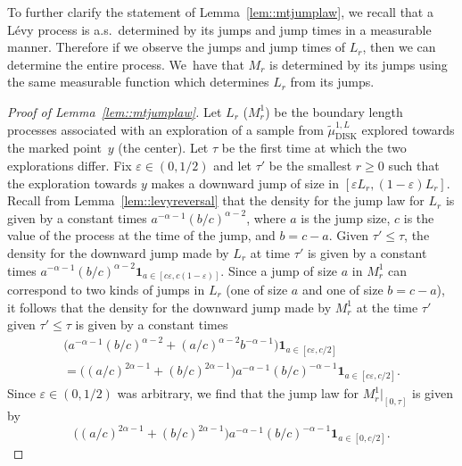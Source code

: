 \documentclass[JEP,XML,SOM,Unicode]{cedram}
\let\epsilon\varepsilon
\theoremstyle{plain}
\numberwithin{theorem}{section}
\theoremstyle{definition}
\newcommand{\one}{{\mathbf 1}}
\newcommand{\tmudonel}{\wt{\mu}_{ \mathrm{DISK}}^{1, L}}
\let\wt\widetilde
\begin{document}
To further clarify the statement of Lemma~\ref{lem::mtjumplaw}, we recall that a Lévy process is a.s.\ determined by its jumps and jump times in a measurable manner. Therefore if we observe the jumps and jump times of $L_r$, then we can determine the entire process. We~have that $M_r$ is determined by its jumps using the same measurable function which determines $L_r$ from its jumps.

\begin{proof}[Proof of Lemma~\ref{lem::mtjumplaw}]
Let $L_r$ (\resp $M_r^1$) be the boundary length processes associated with an exploration of a sample from $\tmudonel$ explored towards the marked point~$y$ (\resp the center). Let $\tau$ be the first time at which the two explorations differ. Fix $\epsilon \in (0,1/2)$ and let $\tau'$ be the smallest $r \geq 0$ such that the exploration towards $y$ makes a downward jump of size in $[\epsilon L_r,(1-\epsilon) L_r]$. Recall from Lemma~\ref{lem::levyreversal} that the density for the jump law for $L_r$ is given by a constant times $a^{-\alpha-1} (b/c)^{\alpha - 2}$, where $a$ is the jump size, $c$ is the value of the process at the time of the jump, and $b = c-a$. Given $\tau' \leq \tau$, the density for the downward jump made by $L_r$ at time $\tau'$ is given by a constant times $a^{-\alpha-1} (b/c)^{\alpha-2} \one_{a \in [c \epsilon,c(1-\epsilon)]}$. Since a jump of size $a$ in $M_r^1$ can correspond to two kinds of jumps in $L_r$ (one of size $a$ and one of size $b=c-a$), it follows that the density for the downward jump made by $M_r^1$ at the time $\tau'$ given $\tau' \leq \tau$ is given by a constant times
\begin{multline*}
\bigl(a^{-\alpha-1} (b/c)^{\alpha - 2} + (a/c)^{\alpha-2} b^{-\alpha - 1}\bigr)\one_{a \in [c \epsilon,c/2]}\\
= \big( (a/c)^{2\alpha-1} + (b/c)^{2\alpha - 1}\bigr) a^{-\alpha - 1} (b/c)^{-\alpha-1} \one_{a \in [c \epsilon,c/2]}.
\end{multline*}
Since $\epsilon \in (0,1/2)$ was arbitrary, we find that the jump law for $M_r^1|_{[0,\tau]}$ is given by
\begin{equation}
\label{eqn::mtonejump}
\big( (a/c)^{2\alpha-1} + (b/c)^{2\alpha - 1}\bigr) a^{-\alpha - 1} (b/c)^{-\alpha-1} \one_{a \in [0,c/2]}.
\end{equation}


\end{proof}
\end{document}
